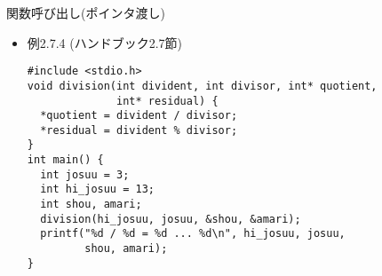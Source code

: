 \begin{frame}[t,fragile]{関数呼び出し(ポインタ渡し)}
  \begin{itemize}
  \item 例2.7.4 (ハンドブック2.7節)
\begin{lstlisting}
#include <stdio.h>
void division(int divident, int divisor, int* quotient,
              int* residual) {
  *quotient = divident / divisor;
  *residual = divident % divisor;
}
int main() {
  int josuu = 3;
  int hi_josuu = 13;
  int shou, amari;
  division(hi_josuu, josuu, &shou, &amari);
  printf("%d / %d = %d ... %d\n", hi_josuu, josuu,
         shou, amari);
}
\end{lstlisting}
  \end{itemize}
\end{frame}
